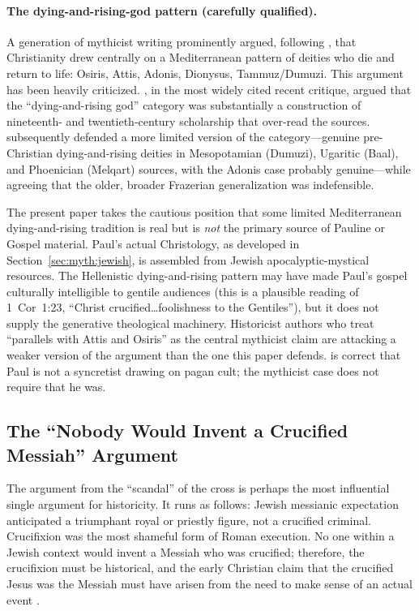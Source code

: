\documentclass[12pt,oneside]{article}
\begin{document}
\paragraph{The dying-and-rising-god pattern (carefully qualified).}
A generation of mythicist writing prominently argued, following
\citet{Frazer1890}, that Christianity drew centrally on a Mediterranean
pattern of deities who die and return to life: Osiris, Attis, Adonis,
Dionysus, Tammuz/Dumuzi.  This argument has been heavily criticized.
\citet{Smith2005}, in the most widely cited recent critique, argued
that the \enquote{dying-and-rising god} category was substantially a
construction of nineteenth- and twentieth-century scholarship that
over-read the sources.  \citet{Mettinger2001} subsequently defended a
more limited version of the category---genuine pre-Christian
dying-and-rising deities in Mesopotamian (Dumuzi), Ugaritic (Baal),
and Phoenician (Melqart) sources, with the Adonis case probably
genuine---while agreeing that the older, broader Frazerian
generalization was indefensible.

The present paper takes the cautious position that some limited
Mediterranean dying-and-rising tradition is real but is \textit{not}
the primary source of Pauline or Gospel material.  Paul's actual
Christology, as developed in Section~\ref{sec:myth:jewish}, is
assembled from Jewish apocalyptic-mystical resources.  The Hellenistic
dying-and-rising pattern may have made Paul's gospel culturally
intelligible to gentile audiences (this is a plausible reading of
1~Cor~1:23, \enquote{Christ crucified\ldots foolishness to the
Gentiles}), but it does not supply the generative theological machinery.
Historicist authors who treat \enquote{parallels with Attis and Osiris}
as the central mythicist claim are attacking a weaker version of the
argument than the one this paper defends.  \citet{Fredriksen2017} is
correct that Paul is not a syncretist drawing on pagan cult; the
mythicist case does not require that he was.

\subsection{The ``Nobody Would Invent a Crucified Messiah'' Argument}
\label{sec:myth:crucified}

The argument from the ``scandal'' of the cross is perhaps the most
influential single argument for historicity.  It runs as follows: Jewish
messianic expectation anticipated a triumphant royal or priestly figure,
not a crucified criminal.  Crucifixion was the most shameful form of
Roman execution.  No one within a Jewish context would invent a Messiah
who was crucified; therefore, the crucifixion must be historical, and
the early Christian claim that the crucified Jesus was the Messiah must
have arisen from the need to make sense of an actual event
\citep{Hengel1977,Wright1996}.
\end{document}
